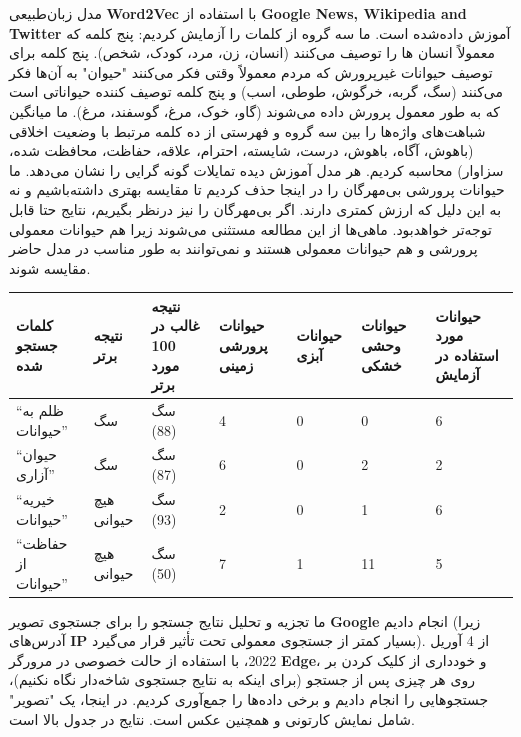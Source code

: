 مدل زبان‌طبیعی \textenglish{\textbf{Word2Vec}} با استفاده از \textenglish{\textbf{Google News, Wikipedia and Twitter}} آموزش داده‌شده است.
ما سه گروه از کلمات را آزمایش کردیم: پنج کلمه که معمولاً انسان ها را توصیف می‌کنند (انسان، زن، مرد، کودک، شخص).
پنج کلمه برای توصیف حیوانات غیرپرورش که مردم معمولاً وقتی فکر می‌کنند "حیوان" به آن‌ها فکر می‌کنند (سگ، گربه، خرگوش، طوطی، اسب) و پنج کلمه توصیف کننده حیواناتی است که به طور معمول پرورش داده می‌شوند (گاو، خوک، مرغ، گوسفند، مرغ).
ما میانگین شباهت‌های واژه‌ها را بین سه گروه و فهرستی از ده کلمه مرتبط با وضعیت اخلاقی (باهوش، آگاه، باهوش، درست، شایسته، احترام، علاقه، حفاظت، محافظت شده، سزاوار) محاسبه کردیم.
هر مدل آموزش دیده تمایلات گونه گرایی را نشان می‌دهد.
ما حیوانات پرورشی بی‌مهرگان را در اینجا حذف کردیم تا مقایسه بهتری داشته‌باشیم و نه به این دلیل که ارزش کمتری دارند.
اگر بی‌مهرگان را نیز در‌نظر بگیریم، نتایج حتا قابل توجه‌تر خواهد‌بود.
ماهی‌ها از این مطالعه مستثنی می‌شوند زیرا هم حیوانات معمولی پرورشی و هم حیوانات معمولی هستند و نمی‌توانند به طور مناسب در مدل حاضر مقایسه شوند.



\begin{table}[ht]
    \scriptsize %
    \setlength{\tabcolsep}{4pt} %
    \renewcommand{\arraystretch}{1.5} %
    \begin{tabular}{|p{1.5cm}|p{1.2cm}|p{1.5cm}|p{1.5cm}|p{1.5cm}|p{1.5cm}|p{1.5cm}|}
        \hline
        کلمات جستجو شده & نتیجه برتر & نتیجه غالب در 100 مورد برتر & حیوانات پرورشی زمینی & حیوانات آبزی & حیوانات وحشی خشکی & حیوانات مورد استفاده در آزمایش \\
        \hline
        “ظلم به حیوانات” & سگ & سگ (88) & 4 & 0 & 0 & 6 \\
        “حیوان آزاری” & سگ & سگ (87) & 6 & 0 & 2 & 2 \\
        “خیریه حیوانات” & هیچ حیوانی & سگ (93) & 2 & 0 & 1 & 6 \\
        “حفاظت از حیوانات” & هیچ حیوانی & سگ (50) & 7 & 1 & 11 & 5 \\
        \hline
    \end{tabular}
    \label{tab:table}
\end{table}


ما تجزیه و تحلیل نتایج جستجو را برای جستجوی تصویر \textenglish{\textbf{Google}} انجام دادیم (زیرا آدرس‌های \textenglish{\textbf{IP}} بسیار کمتر از جستجوی معمولی تحت تأثیر قرار می‌گیرد).
از 4 آوریل 2022، با استفاده از حالت خصوصی در مرورگر \textenglish{\textbf{Edge}}، و خودداری از کلیک کردن بر روی هر چیزی پس از جستجو (برای اینکه به نتایج جستجوی شاخه‌دار نگاه نکنیم)، جستجوهایی را انجام دادیم و برخی داده‌ها را جمع‌آوری کردیم.
در اینجا، یک "تصویر" شامل نمایش کارتونی و همچنین عکس است.
نتایج در جدول بالا است.


